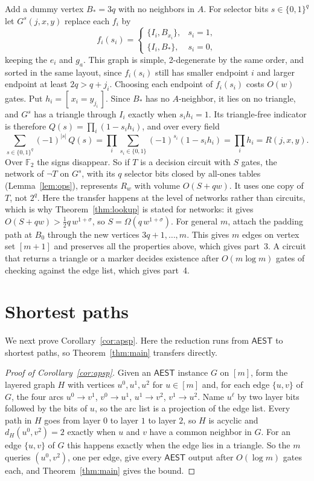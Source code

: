 \documentclass[11pt]{article}
\theoremstyle{definition}
\theoremstyle{remark}
\newcommand{\F}{\mathbb{F}}
\newcommand{\AEST}{\mathsf{AEST}}
\newcommand{\ind}[1]{[\,#1\,]}
\begin{document}
Add a dummy vertex $B_*=3q$ with no neighbors in $A$. For selector bits
$s\in\{0,1\}^q$ let $G^s(j,x,y)$ replace each $f_i$ by
\[
f_i(s_i)=\begin{cases}\{I_i,B_{x_i}\},&s_i=1,\\ \{I_i,B_*\},&s_i=0,\end{cases}
\]
keeping the $e_i$ and $g_a$. This graph is simple, 2-degenerate by the same
order, and sorted in the same layout, since $f_i(s_i)$ still has smaller
endpoint $i$ and larger endpoint at least $2q>q+j_i$. Choosing each
endpoint of $f_i(s_i)$ costs $O(w)$ gates. Put $h_i=\ind{x_i=y_{j_i}}$.
Since $B_*$ has no $A$-neighbor, it lies on no triangle, and $G^s$ has a
triangle through $I_i$ exactly when $s_ih_i=1$. Its triangle-free
indicator is therefore $Q(s)=\prod_i(1-s_ih_i)$, and over every field
\[
\sum_{s\in\{0,1\}^q}(-1)^{|s|}\,Q(s)
=\prod_{i}\sum_{s_i\in\{0,1\}}(-1)^{s_i}(1-s_ih_i)
=\prod_i h_i=R(j,x,y).
\]
Over $\F_2$ the signs disappear. So if $T$ is a decision circuit with $S$
gates, the network of $\neg T$ on $G^s$, with its $q$ selector bits closed
by all-ones tables (Lemma~\ref{lem:ops}), represents $R_w$ with volume
$O(S+qw)$. It uses one copy of $T$, not $2^q$. Here the transfer happens
at the level of networks rather than circuits, which is why
Theorem~\ref{thm:lookup} is stated for networks:
it gives $O(S+qw)>\tfrac12q\,w^{1+\sigma}$, so
$S=\Omega(q\,w^{1+\sigma})$. For general $m$,
attach the padding path at $B_0$ through the new vertices $3q+1,\dots,m$.
This gives $m$ edges on vertex set $[m+1]$ and preserves all the
properties above, which gives part~3. A circuit
that returns a triangle or a marker decides existence after $O(m\log m)$
gates of checking against the edge list, which gives part~4.

\section{Shortest paths}\label{sec:apsp}

We next prove Corollary~\ref{cor:apsp}. Here the reduction runs from
$\AEST$ to shortest paths, so Theorem~\ref{thm:main} transfers directly.

\begin{proof}[Proof of Corollary~\ref{cor:apsp}]
Given an $\AEST$ instance $G$ on $[m]$, form the layered graph $H$ with
vertices $u^0,u^1,u^2$ for $u\in[m]$ and, for each edge $\{u,v\}$ of $G$,
the four arcs $u^0\to v^1$, $v^0\to u^1$, $u^1\to v^2$, $v^1\to u^2$.
Name $u^\ell$ by two layer bits followed by the bits of $u$, so the arc
list is a projection of the edge list. Every path in $H$ goes from layer
$0$ to layer $1$ to layer $2$, so $H$ is acyclic and
$d_H(u^0,v^2)=2$ exactly when $u$ and $v$ have a common neighbor in $G$.
For an edge $\{u,v\}$ of $G$ this happens exactly when the edge lies in a
triangle. So the $m$ queries $(u^0,v^2)$, one per edge, give every $\AEST$
output after $O(\log m)$ gates each, and Theorem~\ref{thm:main} gives the
bound.
\end{proof}
\end{document}
